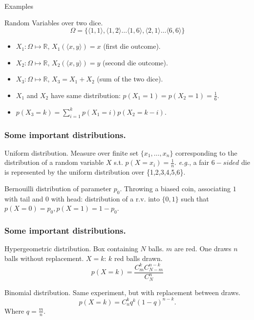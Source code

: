 \documentclass{beamer}
\begin{document}
\begin{frame}{Examples}
  \begin{exampleblock}{Random Variables over two dice.}
    \[\Omega = \{\langle 1,1 \rangle, \langle 1,2 \rangle \dots \langle 1,6 \rangle, \langle 2,1 \rangle \dots \langle 6,6 \rangle\}\]
    \begin{itemize}
    \item $X_1: \Omega \mapsto \mathbb{R}$, $X_1(\langle x,y \rangle) = x$ (first die outcome).
    \item $X_2: \Omega \mapsto \mathbb{R}$, $X_2(\langle x,y \rangle) = y$ (second die outcome).
    \item $X_3: \Omega \mapsto \mathbb{R}$, $X_3 = X_1 + X_2$ (sum of the two dice).
    \end{itemize}
  \end{exampleblock}

  \begin{itemize}
  \item $X_1$ and $X_2$ have same distribution: $p(X_1 = 1) = p(X_2 = 1) = \frac{1}{6}$.
  \item $p(X_3 = k) = \sum^{k}_{i=1} p(X_1 = i)p(X_2 = k - i)$. 
  \end{itemize}  
\end{frame}

\begin{frame}
  \frametitle{Some important distributions.}

  \begin{exampleblock}{Uniform distribution.}
    Measure over finite set $\{x_1, \dots, x_n\}$ corresponding to the distribution of a random variable $X$ s.t. $p(X = x_i) = \frac{1}{n}$. \emph{e.g.}, a fair $6-sided$ die is represented by the uniform distribution over \{1,2,3,4,5,6\}.
  \end{exampleblock}

  \begin{exampleblock}{Bernouilli distribution of parameter $p_0$.}
    Throwing a biased coin, associating $1$ with tail and $0$ with head: distribution of a r.v. into $\{0, 1\}$ such that $p(X = 0) = p_0, p(X = 1) = 1 - p_0$.
  \end{exampleblock}
\end{frame}

\begin{frame}
  \frametitle{Some important distributions.}
  \begin{exampleblock}{Hypergeometric distribution.}
    Box containing $N$ balls. $m$ are red. One draws $n$ balls without replacement. $X = k$: $k$ red balls drawn.
    \[
    p(X = k) = \frac{C^k_mC^{n-k}_{N-m}}{C^n_N}
    \]
  
  \end{exampleblock}

  \begin{exampleblock}{Binomial distribution.}
    Same experiment, but with replacement between draws.
    \[
    p(X = k) = C^k_nq^{k}(1 - q)^{n-k}.
    \]
    Where $q = \frac{m}{n}$.
  \end{exampleblock}
  
\end{frame}
\end{document}
